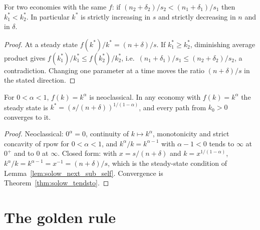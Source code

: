 \begin{theorem}
\label{thm:solow_comparative_statics}
\leanok
{}
For two economies with the same $f$: if $(n_2 + \delta_2)/s_2 < (n_1 + \delta_1)/s_1$ then $k^*_1 < k^*_2$.
In particular $k^*$ is strictly increasing in $s$ and strictly decreasing in $n$ and in $\delta$.
\end{theorem}
\begin{proof}
\leanok
At a steady state $f(k^*)/k^* = (n + \delta)/s$. If $k^*_1 \ge k^*_2$, diminishing average product gives
$f(k^*_1)/k^*_1 \le f(k^*_2)/k^*_2$, i.e.\ $(n_1 + \delta_1)/s_1 \le (n_2 + \delta_2)/s_2$, a contradiction.
Changing one parameter at a time moves the ratio $(n + \delta)/s$ in the stated direction.
\end{proof}

\begin{theorem}
\label{thm:solow_cobbDouglas}
\leanok
{}
For $0 < \alpha < 1$, $f(k) = k^\alpha$ is neoclassical. In any economy with $f(k) = k^\alpha$ the steady state is
$k^* = (s/(n + \delta))^{1/(1-\alpha)}$, and every path from $k_0 > 0$ converges to it.
\end{theorem}
\begin{proof}
\leanok
Neoclassical: $0^\alpha = 0$, continuity of $k \mapsto k^\alpha$, monotonicity and strict concavity of
$\mathrm{rpow}$ for $0 < \alpha < 1$, and $k^\alpha / k = k^{\alpha - 1}$ with $\alpha - 1 < 0$ tends to $\infty$
at $0^+$ and to $0$ at $\infty$. Closed form: with $x = s/(n + \delta)$ and $k = x^{1/(1-\alpha)}$,
$k^\alpha / k = k^{\alpha - 1} = x^{-1} = (n + \delta)/s$, which is the steady-state condition of
Lemma~\ref{lem:solow_next_sub_self}. Convergence is Theorem~\ref{thm:solow_tendsto}.
\end{proof}

\section{The golden rule}
\label{sec:golden_rule}

